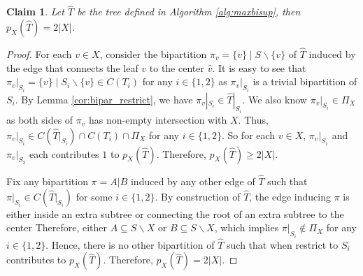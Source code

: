 \documentclass{bmcart}
\newtheorem{claim}{Claim}
\begin{document}
\begin{claim} \label{claim:begin}
    Let $\hat{T}$ be the tree defined in Algorithm \ref{alg:maxbisup}, then $p_X(\hat{T}) = 2 |X|$. 
\end{claim}
\begin{proof}
    For each $v \in X$, consider the bipartition $\pi_v = \{v\}\mid S \backslash \{v\}$ of $\hat{T}$ induced by the edge that connects the leaf $v$ to the center $\hat{v}$. It is easy to see that $\pi_v|_{S_i} = \{v\} \mid S_i \backslash \{v\} \in C(T_i)$ for any $i\in\{1,2\}$ as $\pi_v|_{S_i}$ is a trivial bipartition of $S_i$. By Lemma \ref{cor:bipar_restrict}, we have $\pi_v|_{S_i} \in \hat{T}|_{S_i}$. We also know $\pi_v|_{S_i} \in \Pi_X$ as both sides of $\pi_v$ has non-empty intersection with $X$. Thus, $\pi_v|_{S_i} \in C(\hat{T}|_{S_i}) \cap C(T_i) \cap \Pi_X$ for any $i \in \{1,2\}$. So for each $v \in X$, $\pi_v|_{S_1}$ and $\pi_v|_{S_2}$ each contributes $1$ to $p_X(\hat{T})$. Therefore, $p_X(\hat{T}) \ge 2|X|$. \smallskip
    
    Fix any bipartition $\pi = A|B$ induced by any other edge of $\hat{T}$ such that $\pi|_{S_i} \in C(\hat{T}|_{S_i})$ for some $i \in \{1,2\}$. By construction of $\hat{T}$, the edge inducing $\pi$ is either inside an extra subtree or connecting the root of an extra subtree to the center Therefore, either $A \subseteq S\backslash X $ or $B \subseteq S \backslash X$, which implies $\pi|_{S_i} \notin \Pi_X$ for any $i \in \{1,2\}$. Hence, there is no other bipartition of $\hat{T}$ such that when restrict to $S_i$ contributes to $p_X(\hat{T})$. Therefore, $p_X(\hat{T}) = 2|X|$.
\end{proof}
\end{document}
